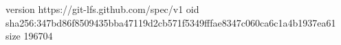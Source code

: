 version https://git-lfs.github.com/spec/v1
oid sha256:347bd86f8509435bba47119d2cb571f5349fffae8347c060ca6c1a4b1937ea61
size 196704
